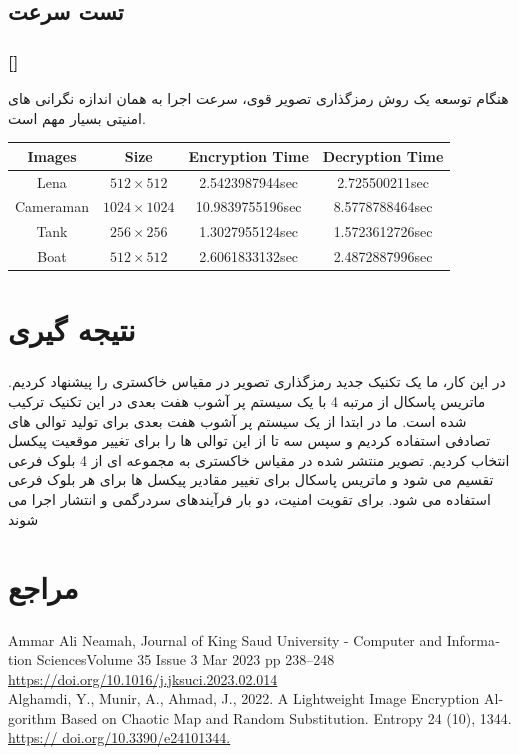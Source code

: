 \documentclass[xcolor=dvipsnames, professionalfonts, 11pt]{beamer}
\newcommand*{\makeframetitle}{\frametitle{\insertsection \hspace{0.1em} {\footnotesize [\insertsubsection]}}}
\begin{document}
\subsection{تست سرعت}
\begin{frame}
    \makeframetitle
    هنگام توسعه یک روش رمزگذاری تصویر قوی، سرعت اجرا به همان اندازه نگرانی های امنیتی بسیار مهم است.
    \begin{latin}
        \begin{center}
            \begin{tabular}{|c|c|c|c|}
                \hline
                 Images & Size & Encryption Time & Decryption Time \\
                \hline
                Lena & \(512\times 512\) & 2.5423987944sec & 2.725500211sec\\
                \hline
                Cameraman & \(1024\times 1024\) & 10.9839755196sec & 8.5778788464sec\\
                \hline
                Tank & \(256\times 256\) & 1.3027955124sec & 1.5723612726sec\\
                \hline
                Boat & \(512\times 512\) & 2.6061833132sec & 2.4872887996sec\\
                \hline
            \end{tabular}
        \end{center}
    \end{latin}
\end{frame}

\section{نتیجه گیری}
\begin{frame}
    \frametitle{\insertsection}
    در این کار، ما یک تکنیک جدید رمزگذاری تصویر در مقیاس خاکستری را پیشنهاد کردیم. ماتریس پاسکال از مرتبه 4 با یک سیستم پر آشوب هفت بعدی در این تکنیک ترکیب شده است.
    ما در ابتدا از یک سیستم پر آشوب هفت بعدی برای تولید توالی های تصادفی استفاده کردیم و سپس سه تا از این توالی ها را برای تغییر موقعیت پیکسل انتخاب کردیم. تصویر منتشر شده در مقیاس خاکستری به مجموعه ای از 4 بلوک فرعی تقسیم می شود و ماتریس پاسکال برای تغییر مقادیر پیکسل ها برای هر بلوک فرعی استفاده می شود.
    برای تقویت امنیت، دو بار فرآیندهای سردرگمی و انتشار اجرا می شوند


\end{frame}

\section{مراجع}
\begin{frame}
    \frametitle{\insertsection}
    \begin{latin}
Ammar Ali Neamah, Journal of King Saud University - Computer and Information SciencesVolume 35 Issue 3 Mar 2023 pp 238–248 \url{https://doi.org/10.1016/j.jksuci.2023.02.014}\\
        Alghamdi, Y., Munir, A., Ahmad, J., 2022. A Lightweight Image Encryption Algorithm
Based on Chaotic Map and Random Substitution. Entropy 24 (10), 1344. \url{https://
doi.org/10.3390/e24101344.}
    \end{latin}
\end{frame}
\end{document}
